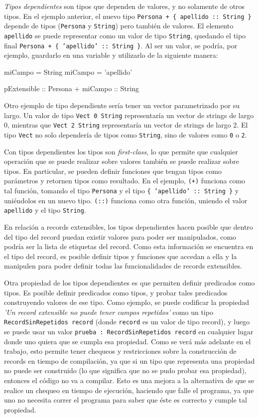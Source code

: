 \textit{Tipos dependientes} son tipos que dependen de valores, y no solamente de otros tipos. En el ejemplo anterior, el nuevo tipo \texttt{Persona + \{ apellido :: String \}} depende de tipos (\texttt{Persona} y \texttt{String}) pero también de valores. El elemento \texttt{apellido} se puede representar como un valor de tipo \texttt{String}, quedando el tipo final \texttt{Persona + \{ 'apellido' :: String \}}. Al ser un valor, se podría, por ejemplo, guardarlo en una variable y utilizarlo de la siguiente manera:

\begin{code}
miCampo = String
miCampo = 'apellido'

pExtensible :: Persona + { miCampo :: String }
\end{code}

Otro ejemplo de tipo dependiente sería tener un vector parametrizado por su largo. Un valor de tipo \texttt{Vect 0 String} representaría un vector de strings de largo 0, mientras que \texttt{Vect 2 String} representaría un vector de strings de largo 2. El tipo \texttt{Vect} no solo dependería de tipos como \texttt{String}, sino de valores como \texttt{0} o \texttt{2}.

Con tipos dependientes los tipos son \textit{first-class}, lo que permite que cualquier operación que se puede realizar sobre valores también se puede realizar sobre tipos. En particular, se pueden definir funciones que tengan tipos como parámetros y retornen tipos como resultado. En el ejemplo, \texttt{(+)} funciona como tal función, tomando el tipo \texttt{Persona} y el tipo \texttt{\{ 'apellido' :: String \}} y uniéndolos en un nuevo tipo. \texttt{(::)} funciona como otra función, uniendo el valor \texttt{apellido} y el tipo \texttt{String}.

En relación a records extensibles, los tipos dependientes hacen posible que dentro del tipo del record puedan existir valores para poder ser manipulados, como podría ser la lista de etiquetas del record. Como esta información se encuentra en el tipo del record, es posible definir tipos y funciones que accedan a ella y la manipulen para poder definir todas las funcionalidades de records extensibles.

Otra propiedad de los tipos dependientes es que permiten definir predicados como tipos. Es posible definir predicados como tipos, y probar tales predicados construyendo valores de ese tipo. Como ejemplo, se puede codificar la propiedad \textit{'Un record extensible no puede tener campos repetidos'} como un tipo \texttt{RecordSinRepetidos record} (donde \texttt{record} es un valor de tipo record), y luego se puede usar un valor \texttt{prueba : RecordSinRepetidos record} en cualquier lugar donde uno quiera que se cumpla esa propiedad. Como se verá más adelante en el trabajo, esto permite tener chequeos y restricciones sobre la construcción de records en tiempo de compilación, ya que si un tipo que representa una propiedad no puede ser construido (lo que significa que no se pudo probar esa propiedad), entonces el código no va a compilar. Esto es una mejora a la alternativa de que se realice un chequeo en tiempo de ejecución, haciendo que falle el programa, ya que uno no necesita correr el programa para saber que éste es correcto y cumple tal propiedad.

